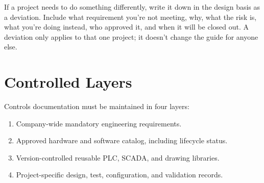 If a project needs to do something differently, write it down in the design basis as a deviation. Include what requirement you're not meeting, why, what the risk is, what you're doing instead, who approved it, and when it will be closed out. A deviation only applies to that one project; it doesn't change the guide for anyone else.

\section{Controlled Layers}
Controls documentation must be maintained in four layers:
\begin{enumerate}[itemsep=2pt]
  \item Company-wide mandatory engineering requirements.
  \item Approved hardware and software catalog, including lifecycle status.
  \item Version-controlled reusable PLC, SCADA, and drawing libraries.
  \item Project-specific design, test, configuration, and validation records.
\end{enumerate}
